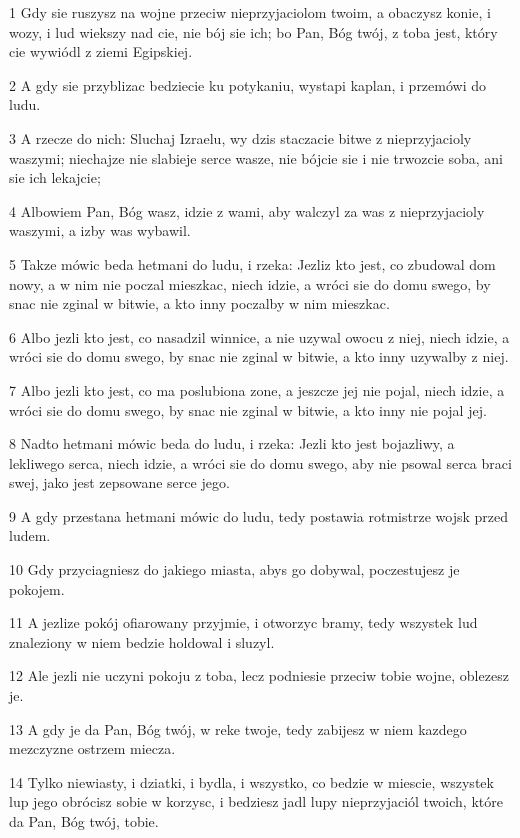 \par 1 Gdy sie ruszysz na wojne przeciw nieprzyjaciolom twoim, a obaczysz konie, i wozy, i lud wiekszy nad cie, nie bój sie ich; bo Pan, Bóg twój, z toba jest, który cie wywiódl z ziemi Egipskiej.
\par 2 A gdy sie przyblizac bedziecie ku potykaniu, wystapi kaplan, i przemówi do ludu.
\par 3 A rzecze do nich: Sluchaj Izraelu, wy dzis staczacie bitwe z nieprzyjacioly waszymi; niechajze nie slabieje serce wasze, nie bójcie sie i nie trwozcie soba, ani sie ich lekajcie;
\par 4 Albowiem Pan, Bóg wasz, idzie z wami, aby walczyl za was z nieprzyjacioly waszymi, a izby was wybawil.
\par 5 Takze mówic beda hetmani do ludu, i rzeka: Jezliz kto jest, co zbudowal dom nowy, a w nim nie poczal mieszkac, niech idzie, a wróci sie do domu swego, by snac nie zginal w bitwie, a kto inny poczalby w nim mieszkac.
\par 6 Albo jezli kto jest, co nasadzil winnice, a nie uzywal owocu z niej, niech idzie, a wróci sie do domu swego, by snac nie zginal w bitwie, a kto inny uzywalby z niej.
\par 7 Albo jezli kto jest, co ma poslubiona zone, a jeszcze jej nie pojal, niech idzie, a wróci sie do domu swego, by snac nie zginal w bitwie, a kto inny nie pojal jej.
\par 8 Nadto hetmani mówic beda do ludu, i rzeka: Jezli kto jest bojazliwy, a lekliwego serca, niech idzie, a wróci sie do domu swego, aby nie psowal serca braci swej, jako jest zepsowane serce jego.
\par 9 A gdy przestana hetmani mówic do ludu, tedy postawia rotmistrze wojsk przed ludem.
\par 10 Gdy przyciagniesz do jakiego miasta, abys go dobywal, poczestujesz je pokojem.
\par 11 A jezlize pokój ofiarowany przyjmie, i otworzyc bramy, tedy wszystek lud znaleziony w niem bedzie holdowal i sluzyl.
\par 12 Ale jezli nie uczyni pokoju z toba, lecz podniesie przeciw tobie wojne, oblezesz je.
\par 13 A gdy je da Pan, Bóg twój, w reke twoje, tedy zabijesz w niem kazdego mezczyzne ostrzem miecza.
\par 14 Tylko niewiasty, i dziatki, i bydla, i wszystko, co bedzie w miescie, wszystek lup jego obrócisz sobie w korzysc, i bedziesz jadl lupy nieprzyjaciól twoich, które da Pan, Bóg twój, tobie.
